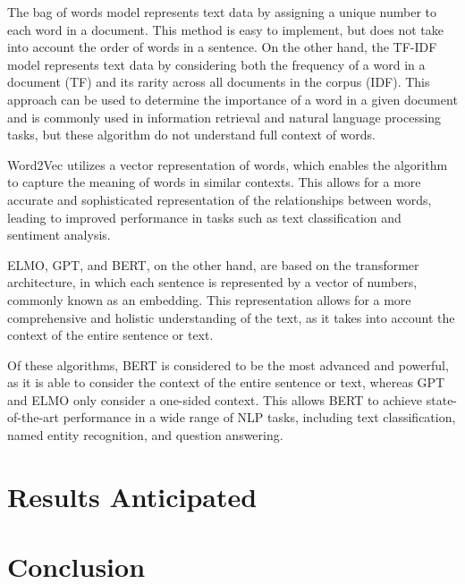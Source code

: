 \documentclass[PI]{ProjectProposal}
\begin{document}
The bag of words model represents text data by assigning a unique number to each word in a document. This method is easy to implement, but does not take into account the order of words in a sentence. On the other hand, the TF-IDF model represents text data by considering both the frequency of a word in a document (TF) and its rarity across all documents in the corpus (IDF). This approach can be used to determine the importance of a word in a given document and is commonly used in information retrieval and natural language processing tasks, but these algorithm do not understand full context of words.

Word2Vec utilizes a vector representation of words, which enables the algorithm to capture the meaning of words in similar contexts. This allows for a more accurate and sophisticated representation of the relationships between words, leading to improved performance in tasks such as text classification and sentiment analysis.

ELMO, GPT, and BERT, on the other hand, are based on the transformer architecture, in which each sentence is represented by a vector of numbers, commonly known as an embedding. This representation allows for a more comprehensive and holistic understanding of the text, as it takes into account the context of the entire sentence or text.

Of these algorithms, BERT is considered to be the most advanced and powerful\autocite{devlin2018bert}, as it is able to consider the context of the entire sentence or text, whereas GPT and ELMO only consider a one-sided context. This allows BERT to achieve state-of-the-art performance in a wide range of NLP tasks, including text classification, named entity recognition, and question answering.

\chapter{Results Anticipated}
\label{sec:org4cc1e15}
\chapter{Conclusion}
\label{sec:org5e7bb9f}
\putbibliography
\appendix
\end{document}
